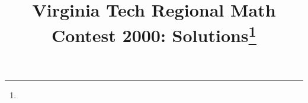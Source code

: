 \documentclass[10pt]{article}
\begin{document}
\title{Virginia Tech Regional Math Contest 2000: Solutions\footnote{\disclaimer}}
\author{\vspace{-2ex}}
\date{\vspace{-5ex}} %
\maketitle

%

%

%

%

%

%

%
\end{document}
